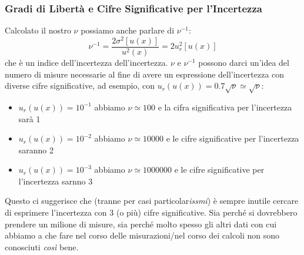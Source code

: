 \documentclass[a4paper,11pt]{report}
\begin{document}
\subsubsection{Gradi di Libertà e Cifre Significative per l'Incertezza}
Calcolato il nostro $\nu$ possiamo anche parlare di $\nu^{-1}$:
$$
  \nu^{-1} = \frac{2\sigma^2[u(x)]}{u^2(x)} = 2 u_r^2[u(x)]
$$
che è un indice dell'incertezza dell'incertezza. $\nu$ e $\nu^{-1}$ possono darci un'idea del numero di misure necessarie al fine di avere un espressione dell'incertezza con diverse cifre significative, ad esempio, con $u_r(u(x)) = 0.7\sqrt{\nu} \simeq \sqrt{\nu}$:
\begin{itemize}
  \item $u_r(u(x)) = 10^{-1}$ abbiamo $\nu \simeq 100$ e la cifra significativa per l'incertezza sarà 1
  \item $u_r(u(x)) = 10^{-2}$ abbiamo $\nu \simeq 10000$ e le cifre significative per l'incertezza saranno 2
  \item $u_r(u(x)) = 10^{-3}$ abbiamo $\nu \simeq 1000000$ e le cifre significative per l'incertezza sarnno 3 
\end{itemize}
Questo ci suggerisce che (tranne per casi particolar\textit{issmi}) è sempre inutile cercare di esprimere l'incertezza con 3 (o più) cifre significative. Sia perché si dovrebbero prendere un milione di misure, sia perché molto spesso gli altri dati con cui abbiamo a che fare nel corso delle misurazioni/nel corso dei calcoli non sono conosciuti \textit{così} bene.
\end{document}
